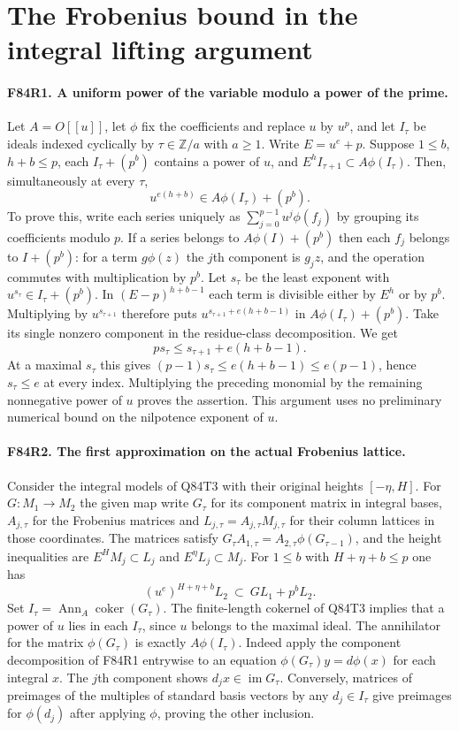 \section{The Frobenius bound in the integral lifting argument}

\paragraph{F84R1. A uniform power of the variable modulo a power of the prime.}
Let $A=O[[u]]$, let $\phi$ fix the coefficients and replace
$u$ by $u^p$, and let $I_\tau$ be ideals indexed cyclically
by $\tau\in\mathbb Z/a$ with $a\ge1$. Write
$E=u^e+p$. Suppose $1\le b$, $h+b\le p$, each
$I_\tau+(p^b)$ contains a power of $u$, and
$E^h I_{\tau+1}\subset A\phi(I_\tau)$.
Then, simultaneously at every $\tau$,
\[
               u^{e(h+b)}\in A\phi(I_\tau)+(p^b).
\]
To prove this, write each series uniquely as
$\sum_{j=0}^{p-1}u^j\phi(f_j)$ by grouping its coefficients
modulo $p$. If a series belongs to $A\phi(I)+(p^b)$ then
each $f_j$ belongs to $I+(p^b)$: for a term
$g\phi(z)$ the $j$th component is $g_j z$, and the operation
commutes with multiplication by $p^b$. Let $s_\tau$ be the
least exponent with $u^{s_\tau}\in I_\tau+(p^b)$.
In $(E-p)^{h+b-1}$ each term is divisible either by $E^h$
or by $p^b$. Multiplying by $u^{s_{\tau+1}}$ therefore puts
$u^{s_{\tau+1}+e(h+b-1)}$ in $A\phi(I_\tau)+(p^b)$.
Take its single nonzero component in the residue-class
decomposition. We get
\[
        p s_\tau\le s_{\tau+1}+e(h+b-1).
\]
At a maximal $s_\tau$ this gives
$(p-1)s_\tau\le e(h+b-1)\le e(p-1)$, hence
$s_\tau\le e$ at every index. Multiplying the preceding
monomial by the remaining nonnegative power of $u$ proves
the assertion. This argument uses no preliminary numerical
bound on the nilpotence exponent of $u$.

\paragraph{F84R2. The first approximation on the actual Frobenius lattice.}
Consider the integral models of Q84T3 with their original
heights $[-\eta,H]$. For $G:M_1\to M_2$ the given
map write $G_\tau$ for its component matrix in integral bases,
$A_{j,\tau}$ for the Frobenius matrices and $L_{j,\tau}=
A_{j,\tau}M_{j,\tau}$ for their column lattices in those
coordinates. The matrices satisfy
$G_\tau A_{1,\tau}=A_{2,\tau}\phi(G_{\tau-1})$,
and the height inequalities are
$E^H M_j\subset L_j$ and $E^\eta L_j\subset M_j$.
For $1\le b$ with $H+\eta+b\le p$ one has
\[
       (u^e)^{H+\eta+b} L_2\ \subset\ G L_1+p^b L_2 .
\]
Set $I_\tau=\operatorname{Ann}_A\operatorname{coker}(G_\tau)$.
The finite-length cokernel of Q84T3 implies that a power of $u$
lies in each $I_\tau$, since $u$ belongs to the maximal ideal.
The annihilator for the matrix $\phi(G_\tau)$ is exactly
$A\phi(I_\tau)$. Indeed apply the component decomposition of
F84R1 entrywise to an equation
$\phi(G_\tau)y=d\phi(x)$ for each integral $x$. The $j$th
component shows $d_j x\in\operatorname{im}G_\tau$.
Conversely, matrices of preimages of the multiples of standard
basis vectors by any $d_j\in I_\tau$ give preimages for
$\phi(d_j)$ after applying $\phi$, proving the other inclusion.

